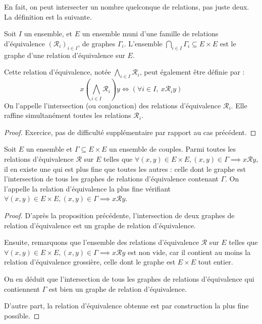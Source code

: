 En fait, on peut intersecter un nombre quelconque de relations, pas juste deux. La définition est la suivante.

\begin{propdef}
Soit $I$ un ensemble, et $E$ un ensemble muni d'une famille de relations d'équivalence $(\mathcal R_i)_{i\in I}$, de graphes $\Gamma_i$. L'ensemble $\bigcap_{i\in I}\Gamma_i \subseteq E\times E$ est le graphe d'une relation d'équivalence sur $E$. 

Cette relation d'équivalence, notée $\bigwedge_{i\in I} \mathcal R_i$, peut également être  définie par
:
\[x (\bigwedge_{i\in I} \mathcal R_i) y \iff \left(\forall i\in I ,\:x\mathcal R_i y\right)
\]
On l'appelle l'intersection (ou conjonction) des relations d'équivalence $\mathcal R_i$. Elle raffine simultanément toutes les relations $\mathcal R_i$.
\end{propdef}
\begin{proof} Exercice, pas de difficulté supplémentaire par rapport au cas précédent.
\end{proof}

\begin{propdef}
Soit $E$ un ensemble et $\Gamma\subseteq E\times E$ un ensemble de couples. Parmi toutes les relations d'équivalence $\mathcal R$ sur $E$ telles que $\forall (x,y)\in E\times E, (x,y)\in \Gamma \implies x\mathcal R y$, il en existe une qui est plus fine que toutes les autres : celle dont le graphe est l'intersection de tous les graphes de relations d'équivalence contenant $\Gamma$. On l'appelle la relation d'équivalence la plus fine vérifiant $\forall (x,y)\in E\times E, (x,y)\in \Gamma \implies x\mathcal R y$.
\end{propdef}
\begin{proof}




D'après la proposition précédente, l'intersection de deux graphes de relation d'équivalence est un graphe de relation d'équivalence.

Ensuite, remarquons que l'ensemble des relations d'équivalence $\mathcal R$ sur $E$ telles que $\forall (x,y)\in E\times E, (x,y)\in \Gamma \implies x\mathcal R y$ est non vide, car il contient au moins la relation d'équivalence grossière, celle dont le graphe est $E\times E$ tout entier.

On en déduit que l'intersection de tous les graphes de relations d'équivalence qui contiennent $\Gamma$ est bien un graphe de relation d'équivalence.

D'autre part, la relation d'équivalence obtenue est par construction la plus fine possible.
\end{proof}

